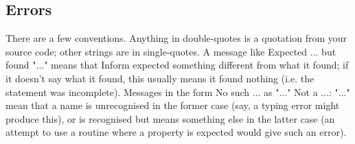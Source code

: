 {{\subsection{Errors}\medskip\noindent
There are a few conventions.  Anything in double-quotes is a quotation from
your source code; other strings are in single-quotes.  A message like
\beginstt
Expected ... but found "..."
\endtt
means that Inform expected something different from what it found; if it
doesn't say what it found, this usually means it found nothing (i.e. the
statement was incomplete).  Messages in the form
\beginstt
No such ... as "..."
Not a ...: "..."
\endtt
mean that a name is unrecognised in the former case (say, a typing error
might produce this), or is recognised but means something else in the latter
case (an attempt to use a routine where a property is expected would give
such an error).

}}
